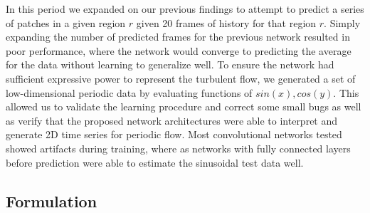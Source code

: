 \documentclass[10pt,letterpaper]{article}
\begin{document}
In this period we expanded on our previous findings to attempt to predict a series of patches in a given region $r$ given 20 frames of history for that region $r$. Simply expanding the number of predicted frames for the previous network resulted in poor performance, where the network would converge to predicting the average for the data without learning to generalize well. To ensure the network had sufficient expressive power to represent the turbulent flow, we generated a set of low-dimensional periodic data by evaluating functions of $sin(x), cos(y)$. This allowed us to validate the learning procedure and correct some small bugs as well as verify that the proposed network architectures were able to interpret and generate 2D time series for periodic flow. Most convolutional networks tested showed artifacts during training, where as networks with fully connected layers before prediction were able to estimate the sinusoidal test data well.

\subsection{Formulation} \label{formulation}
\end{document}
